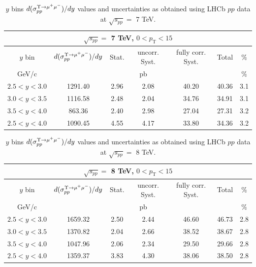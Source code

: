 \begin{table}[!tp]
\begin{center}
\begin{tabular}{|c||c|c|c|c|c|c|}
  \hline
  \multicolumn{7}{|c|}{$\sqrt{s_{pp}}=$ 7 TeV, $0<p_\mathrm{T}<15$}\\
  \hline
  $y$ bin & $d(\sigma_{pp}^{\Upsilon\rightarrow \mu^{+}\mu^{\--}})/dy $ & Stat. & uncorr. Syst. & fully corr. Syst. & Total & $\%$ \\
  \hline
  GeV/c & \multicolumn{5}{c|}{pb} & $\%$ \\
  \hline
  $2.5 < y < 3.0 $ & 1291.40 & 2.96 & 2.08 & 40.20 & 40.36 & 3.1 \\
  \hline
  $3.0 < y < 3.5 $& 1116.58 & 2.48 & 2.04 & 34.76 & 34.91 & 3.1 \\
  \hline
  $3.5 < y < 4.0 $& 863.36 & 2.40 & 2.98 & 27.04 & 27.31 & 3.2 \\
  \hline
  $2.5 < y < 4.0 $& 1090.45 & 4.55 & 4.17 & 33.80 & 34.36 & 3.2 \\
  \hline
\end{tabular}
\caption{$y$ bins $d(\sigma_{pp}^{\Upsilon\rightarrow \mu^{+}\mu^{\--}})/dy $ values and uncertainties as obtained using LHCb $pp$ data at $\sqrt{s_{pp}}=$ 7 TeV.}\label{table:LHCbY1sData7}
\end{center}
\end{table}

\begin{table}[!tp]
\begin{center}
\begin{tabular}{|c||c|c|c|c|c|c|}
  \hline
  \multicolumn{7}{|c|}{$\sqrt{s_{pp}}=$ 8 TeV, $0<p_\mathrm{T}<15$}\\
  \hline
  $y$ bin & $d(\sigma_{pp}^{\Upsilon\rightarrow \mu^{+}\mu^{\--}})/dy $ & Stat. & uncorr. Syst. & fully corr. Syst. & Total & $\%$ \\
  \hline
  GeV/c & \multicolumn{5}{c|}{pb} & $\%$ \\
  \hline
  $2.5 < y < 3.0 $ & 1659.32 & 2.50 & 2.44 & 46.60 & 46.73 & 2.8 \\
  \hline
  $3.0 < y < 3.5 $& 1370.82 & 2.04 & 2.66 & 38.52 & 38.67 & 2.8 \\
  \hline
  $3.5 < y < 4.0 $& 1047.96 & 2.06 & 2.34 & 29.50 & 29.66 & 2.8 \\
  \hline
  $2.5 < y < 4.0 $& 1359.37 & 3.83 & 4.30 & 38.06 & 38.50 & 2.8 \\
  \hline
\end{tabular}
\caption{$y$ bins $d(\sigma_{pp}^{\Upsilon\rightarrow \mu^{+}\mu^{\--}})/dy $ values and uncertainties as obtained using LHCb $pp$ data at $\sqrt{s_{pp}}=$ 8 TeV.}\label{table:LHCbY1sData8}
\end{center}
\end{table}

